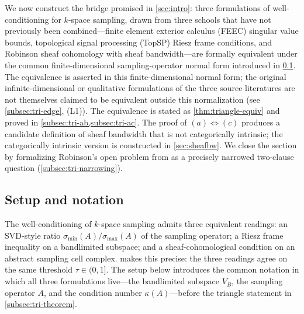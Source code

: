 
We now construct the bridge promised in \cref{sec:intro}: three
formulations of well-conditioning for $k$-space sampling, drawn from
three schools that have not previously been combined---finite element
exterior calculus (FEEC) singular value bounds, topological signal
processing (TopSP) Riesz frame conditions, and Robinson sheaf
cohomology with sheaf bandwidth---are formally equivalent under the
common finite-dimensional sampling-operator normal form introduced
in \cref{subsec:tri-setup}. The equivalence is asserted in this
finite-dimensional normal form; the original infinite-dimensional
or qualitative formulations of the three source literatures are not
themselves claimed to be equivalent outside this normalization (see
\cref{subsec:tri-edge}, (L1)). The equivalence is stated as
\cref{thm:triangle-equiv} and proved in
\cref{subsec:tri-ab,subsec:tri-ac}. The proof of $(a) \Leftrightarrow
(c)$ produces a candidate definition of sheaf bandwidth that is not
categorically intrinsic; the categorically intrinsic version is
constructed in \cref{sec:sheafbw}. We close the section by formalizing
Robinson's open problem from \cite[\S 6]{Robinson2014} as a precisely
narrowed two-clause question (\cref{subsec:tri-narrowing}).

\subsection{Setup and notation}\label{subsec:tri-setup}

The well-conditioning of $k$-space sampling admits three equivalent
readings: an SVD-style ratio $\sigma_{\min}(A)/\sigma_{\max}(A)$ of the
sampling operator; a Riesz frame inequality on a bandlimited subspace;
and a sheaf-cohomological condition on an abstract sampling cell complex.
 makes this precise: the three readings agree
on the same threshold $\tau \in (0,1]$. The setup below introduces the
common notation in which all three formulations live---the bandlimited
subspace $V_B$, the sampling operator $A$, and the condition number
$\kappa(A)$---before the triangle statement in
\cref{subsec:tri-theorem}.

